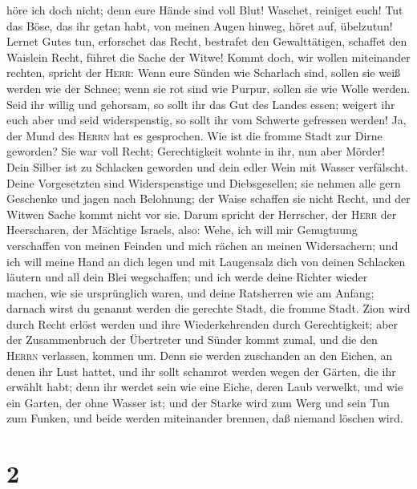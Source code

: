 höre ich doch nicht; denn eure Hände sind voll Blut! 
Waschet, reiniget euch! Tut das Böse, das ihr getan habt, von meinen
Augen hinweg, höret auf, übelzutun!  Lernet Gutes tun,
erforschet das Recht, bestrafet den Gewalttätigen, schaffet den Waislein
Recht, führet die Sache der Witwe!  Kommt doch, wir
wollen miteinander rechten, spricht der \textsc{Herr}: Wenn eure Sünden
wie Scharlach sind, sollen sie weiß werden wie der Schnee; wenn sie rot
sind wie Purpur, sollen sie wie Wolle werden.  Seid ihr
willig und gehorsam, so sollt ihr das Gut des Landes essen;
 weigert ihr euch aber und seid widerspenstig, so sollt
ihr vom Schwerte gefressen werden! Ja, der Mund des \textsc{Herrn} hat
es gesprochen.  Wie ist die fromme Stadt zur Dirne
geworden? Sie war voll Recht; Gerechtigkeit wohnte in ihr, nun aber
Mörder!  Dein Silber ist zu Schlacken geworden und dein
edler Wein mit Wasser verfälscht.  Deine Vorgesetzten
sind Widerspenstige und Diebsgesellen; sie nehmen alle gern Geschenke
und jagen nach Belohnung; der Waise schaffen sie nicht Recht, und der
Witwen Sache kommt nicht vor sie.  Darum spricht der
Herrscher, der \textsc{Herr} der Heerscharen, der Mächtige Israels,
also: Wehe, ich will mir Genugtuung verschaffen von meinen Feinden und
mich rächen an meinen Widersachern;  und ich will meine
Hand an dich legen und mit Laugensalz dich von deinen Schlacken läutern
und all dein Blei wegschaffen;  und ich werde deine
Richter wieder machen, wie sie ursprünglich waren, und deine Ratsherren
wie am Anfang; darnach wirst du genannt werden die gerechte Stadt, die
fromme Stadt.  Zion wird durch Recht erlöst werden und
ihre Wiederkehrenden durch Gerechtigkeit;  aber der
Zusammenbruch der Übertreter und Sünder kommt zumal, und die den
\textsc{Herrn} verlassen, kommen um.  Denn sie werden
zuschanden an den Eichen, an denen ihr Lust hattet, und ihr sollt
schamrot werden wegen der Gärten, die ihr erwählt habt; 
denn ihr werdet sein wie eine Eiche, deren Laub verwelkt, und wie ein
Garten, der ohne Wasser ist;  und der Starke wird zum
Werg und sein Tun zum Funken, und beide werden miteinander brennen, daß
niemand löschen wird.

\hypertarget{section-1}{%
\section{2}\label{section-1}}

